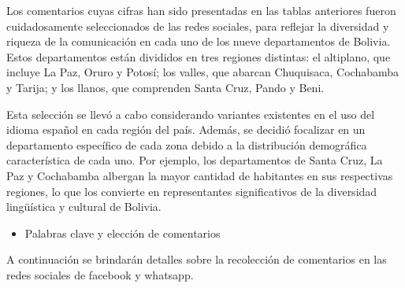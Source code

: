 Los comentarios cuyas cifras han sido presentadas en las tablas anteriores fueron cuidadosamente seleccionados de las redes sociales, para reflejar la diversidad y riqueza de la comunicación en cada uno de los nueve departamentos de Bolivia. Estos departamentos están divididos en tres regiones distintas: el altiplano, que incluye La Paz, Oruro y Potosí; los valles, que abarcan Chuquisaca, Cochabamba y Tarija; y los llanos, que comprenden Santa Cruz, Pando y Beni.

Esta selección se llevó a cabo considerando variantes existentes en el uso del idioma español en cada región del país. Además, se decidió focalizar en un departamento específico de cada zona debido a la distribución demográfica característica de cada uno. Por ejemplo, los departamentos de Santa Cruz, La Paz y Cochabamba albergan la mayor cantidad de habitantes en sus respectivas regiones, lo que los convierte en representantes significativos de la diversidad lingüística y cultural de Bolivia.

\begin{itemize}
\item Palabras clave y elección de comentarios
\end{itemize}
A continuación se brindarán detalles sobre la recolección de comentarios en las redes sociales de facebook y whatsapp.

